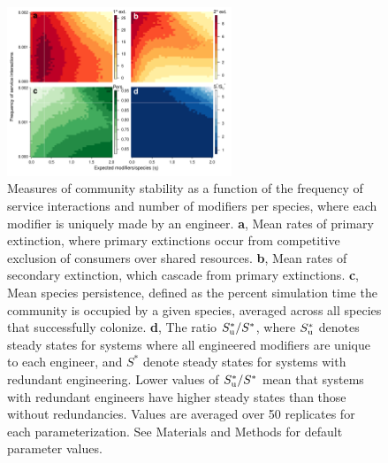 \documentclass[twocolumn,preprintnumbers,amsmath,amssymb,superscriptaddress,linenumbers]{revtex4-1}
\begin{document}
\begin{figure}[h!]
\centering
\includegraphics[width=0.6\textwidth]{fig_engineers5_unique.pdf}
\caption{
Measures of community stability as a function of the frequency of service interactions and number of modifiers per species, where each modifier is uniquely made by an engineer.
\textbf{a}, Mean rates of primary extinction, where primary extinctions occur from competitive exclusion of consumers over shared resources.
\textbf{b}, Mean rates of secondary extinction, which cascade from primary extinctions.
\textbf{c}, Mean species persistence, defined as the percent simulation time the community is occupied by a given species, averaged across all species that successfully colonize.
\textbf{d}, The ratio $S^*_{\rm u}/S^*$, where $S^*_{\rm u}$ denotes steady states for systems where all engineered modifiers are unique to each engineer, and $S^*$ denote steady states for systems with redundant engineering. Lower values of $S^*_{\rm u}/S^*$ mean that systems with redundant engineers have higher steady states than those without redundancies.
Values are averaged over 50 replicates for each parameterization.
See Materials and Methods for default parameter values.
}
\label{fig:unique}
\end{figure}
\end{document}
